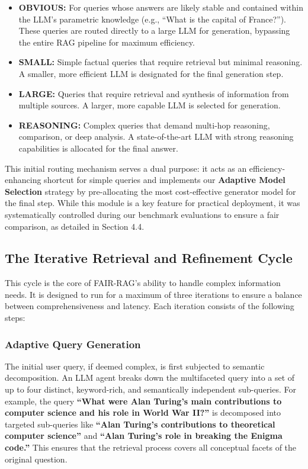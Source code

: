 \documentclass[11pt]{article}
\begin{document}
\begin{itemize}
    \item \textbf{OBVIOUS:} For queries whose answers are likely stable and contained within the LLM's parametric knowledge (e.g., ``What is the capital of France?''). These queries are routed directly to a large LLM for generation, bypassing the entire RAG pipeline for maximum efficiency.
    \item \textbf{SMALL:} Simple factual queries that require retrieval but minimal reasoning. A smaller, more efficient LLM is designated for the final generation step.
    \item \textbf{LARGE:} Queries that require retrieval and synthesis of information from multiple sources. A larger, more capable LLM is selected for generation.
    \item \textbf{REASONING:} Complex queries that demand multi-hop reasoning, comparison, or deep analysis. A state-of-the-art LLM with strong reasoning capabilities is allocated for the final answer.
\end{itemize}

This initial routing mechanism serves a dual purpose: it acts as an efficiency-enhancing shortcut for simple queries and implements our \textbf{Adaptive Model Selection} strategy by pre-allocating the most cost-effective generator model for the final step. While this module is a key feature for practical deployment, it was systematically controlled during our benchmark evaluations to ensure a fair comparison, as detailed in Section 4.4. 

\subsection{The Iterative Retrieval and Refinement Cycle}

This cycle is the core of FAIR-RAG's ability to handle complex information needs. It is designed to run for a maximum of three iterations to ensure a balance between comprehensiveness and latency. Each iteration consists of the following steps:

\subsubsection{Adaptive Query Generation}

The initial user query, if deemed complex, is first subjected to semantic decomposition. An LLM agent breaks down the multifaceted query into a set of up to four distinct, keyword-rich, and semantically independent sub-queries. For example, the query \textbf{``What were Alan Turing's main contributions to computer science and his role in World War II?''} is decomposed into targeted sub-queries like \textbf{``Alan Turing's contributions to theoretical computer science''} and \textbf{``Alan Turing's role in breaking the Enigma code.''} This ensures that the retrieval process covers all conceptual facets of the original question. 
\end{document}
